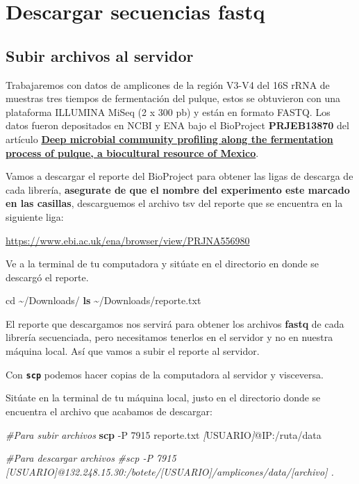 \documentclass[
]{book}
\newenvironment{Shaded}{\begin{snugshade}}{\end{snugshade}}
\newcommand{\AttributeTok}[1]{\textcolor[rgb]{0.13,0.29,0.53}{#1}}
\newcommand{\BuiltInTok}[1]{#1}
\newcommand{\CommentTok}[1]{\textcolor[rgb]{0.56,0.35,0.01}{\textit{#1}}}
\newcommand{\FunctionTok}[1]{\textcolor[rgb]{0.13,0.29,0.53}{\textbf{#1}}}
\newcommand{\NormalTok}[1]{#1}
\newcommand{\PreprocessorTok}[1]{\textcolor[rgb]{0.56,0.35,0.01}{\textit{#1}}}
\newcommand{\SpecialStringTok}[1]{\textcolor[rgb]{0.31,0.60,0.02}{#1}}
\begin{document}
\section{Descargar secuencias fastq}\label{descargar-secuencias-fastq}

\subsection{Subir archivos al servidor}\label{subir-archivos-al-servidor}

Trabajaremos con datos de amplicones de la región V3-V4 del 16S rRNA de muestras tres tiempos de fermentación del pulque, estos se obtuvieron con una plataforma ILLUMINA MiSeq (2 x 300 pb) y están en formato FASTQ. Los datos fueron depositados en NCBI y ENA bajo el BioProject \textbf{PRJEB13870} del artículo \textbf{\href{https://www.sciencedirect.com/science/article/pii/S0944501320304614\#sec0010}{Deep microbial community profiling along the fermentation process of pulque, a biocultural resource of Mexico}}.

Vamos a descargar el reporte del BioProject para obtener las ligas de descarga de cada librería, \textbf{asegurate de que el nombre del experimento este marcado en las casillas}, descarguemos el archivo tsv del reporte que se encuentra en la siguiente liga:

\url{https://www.ebi.ac.uk/ena/browser/view/PRJNA556980}

Ve a la terminal de tu computadora y sitúate en el directorio en donde se descargó el reporte.

\begin{Shaded}
\begin{Highlighting}[]
\BuiltInTok{cd}\NormalTok{ \textasciitilde{}/Downloads/}
\FunctionTok{ls}\NormalTok{ \textasciitilde{}/Downloads/reporte.txt}
\end{Highlighting}
\end{Shaded}

El reporte que descargamos nos servirá para obtener los archivos \textbf{fastq} de cada librería secuenciada, pero necesitamos tenerlos en el servidor y no en nuestra máquina local. Así que vamos a subir el reporte al servidor.

Con \textbf{\texttt{scp}} podemos hacer copias de la computadora al servidor y visceversa.

Sitúate en la terminal de tu máquina local, justo en el directorio donde se encuentra el archivo que acabamos de descargar:

\begin{Shaded}
\begin{Highlighting}[]
\CommentTok{\#Para subir archivos}
\FunctionTok{scp} \AttributeTok{{-}P}\NormalTok{ 7915 reporte.txt }\PreprocessorTok{[}\SpecialStringTok{USUARIO}\PreprocessorTok{]}\NormalTok{@IP:/ruta/data}

\CommentTok{\#Para descargar archivos}
\CommentTok{\#scp {-}P 7915 [USUARIO]@132.248.15.30:/botete/[USUARIO]/amplicones/data/[archivo] .}
\end{Highlighting}
\end{Shaded}
\end{document}
